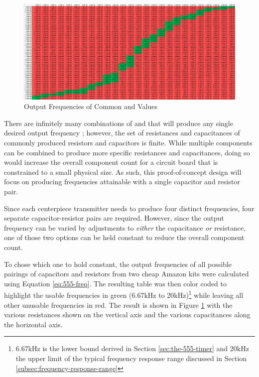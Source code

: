 \begin{figure}
    \centering
    \caption{Output Frequencies of Common  and  Values}
    \label{fig:freq-selection}
    \includegraphics[width=\linewidth]{Figures/6 PCB Design/freq_selection.png}
\end{figure}

There are infinitely many combinations of  and  that
will produce any single desired output frequency ; however, the
set of resistances and capacitances of commonly produced resistors and
capacitors is finite. While multiple components can be combined to
produce more specific resistances and capacitances, doing so would
increase the overall component count for a circuit board that is
constrained to a small physical size. As such, this proof-of-concept
design will focus on producing frequencies attainable with a single
capacitor and resistor pair.

Since each centerpiece transmitter needs to produce four distinct
frequencies, four separate capacitor-resistor pairs are required.
However, since the output frequency can be varied by adjustments to
\emph{either} the capacitance \emph{or} resistance, one of those two
options can be held constant to reduce the overall component count.

To chose which one to hold constant, the output frequencies of all
possible pairings of capacitors and resistors from two cheap Amazon
kits \cite{amazon-capacitors} \cite{amazon-resistors} were calculated
using Equation \ref{eq:555-freq}. The resulting table was then color
coded to highlight the usable frequencies in green (6.67kHz to
20kHz)\footnote{6.67kHz is the lower bound derived in Section
\ref{sec:the-555-timer} and 20kHz the upper limit of the typical
frequency response range discussed in Section
\ref{subsec:frequency-response-range}} while leaving all other unusable
frequencies in red. The result is shown in Figure
\ref{fig:freq-selection} with the various resistances shown on the
vertical axis and the various capacitances along the horizontal axis.


